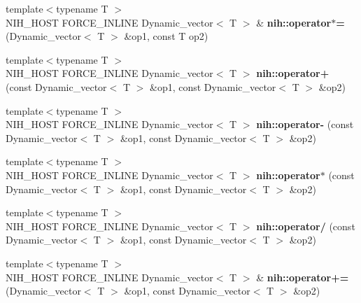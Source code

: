 \begin{DoxyCompactItemize}
\item 
\hypertarget{group__linalg_gaafcb7f500fcb5c8227c8c0b5f0161493}{
{\footnotesize template$<$typename T $>$ }\\\-N\-I\-H\-\_\-\-H\-O\-S\-T \-F\-O\-R\-C\-E\-\_\-\-I\-N\-L\-I\-N\-E \*
\-Dynamic\-\_\-vector$<$ \-T $>$ \& {\bfseries nih\-::operator$\ast$=} (\-Dynamic\-\_\-vector$<$ \-T $>$ \&op1, const \-T op2)}
\label{group__linalg_gaafcb7f500fcb5c8227c8c0b5f0161493}

\item 
\hypertarget{group__linalg_ga76724637f0956192e7a27a921043fa37}{
{\footnotesize template$<$typename T $>$ }\\\-N\-I\-H\-\_\-\-H\-O\-S\-T \-F\-O\-R\-C\-E\-\_\-\-I\-N\-L\-I\-N\-E \*
\-Dynamic\-\_\-vector$<$ \-T $>$ {\bfseries nih\-::operator+} (const \-Dynamic\-\_\-vector$<$ \-T $>$ \&op1, const \-Dynamic\-\_\-vector$<$ \-T $>$ \&op2)}
\label{group__linalg_ga76724637f0956192e7a27a921043fa37}

\item 
\hypertarget{group__linalg_ga6d28166a3044ce64d8a2ab00822cb0d4}{
{\footnotesize template$<$typename T $>$ }\\\-N\-I\-H\-\_\-\-H\-O\-S\-T \-F\-O\-R\-C\-E\-\_\-\-I\-N\-L\-I\-N\-E \*
\-Dynamic\-\_\-vector$<$ \-T $>$ {\bfseries nih\-::operator-\/} (const \-Dynamic\-\_\-vector$<$ \-T $>$ \&op1, const \-Dynamic\-\_\-vector$<$ \-T $>$ \&op2)}
\label{group__linalg_ga6d28166a3044ce64d8a2ab00822cb0d4}

\item 
\hypertarget{group__linalg_gaad54f453a918650977e577d1f1295942}{
{\footnotesize template$<$typename T $>$ }\\\-N\-I\-H\-\_\-\-H\-O\-S\-T \-F\-O\-R\-C\-E\-\_\-\-I\-N\-L\-I\-N\-E \*
\-Dynamic\-\_\-vector$<$ \-T $>$ {\bfseries nih\-::operator$\ast$} (const \-Dynamic\-\_\-vector$<$ \-T $>$ \&op1, const \-Dynamic\-\_\-vector$<$ \-T $>$ \&op2)}
\label{group__linalg_gaad54f453a918650977e577d1f1295942}

\item 
\hypertarget{group__linalg_gab31a91c8d2c51f20dd314272f8416391}{
{\footnotesize template$<$typename T $>$ }\\\-N\-I\-H\-\_\-\-H\-O\-S\-T \-F\-O\-R\-C\-E\-\_\-\-I\-N\-L\-I\-N\-E \*
\-Dynamic\-\_\-vector$<$ \-T $>$ {\bfseries nih\-::operator/} (const \-Dynamic\-\_\-vector$<$ \-T $>$ \&op1, const \-Dynamic\-\_\-vector$<$ \-T $>$ \&op2)}
\label{group__linalg_gab31a91c8d2c51f20dd314272f8416391}

\item 
\hypertarget{group__linalg_gabb3d30c7da278fc844597f94d0a15fec}{
{\footnotesize template$<$typename T $>$ }\\\-N\-I\-H\-\_\-\-H\-O\-S\-T \-F\-O\-R\-C\-E\-\_\-\-I\-N\-L\-I\-N\-E \*
\-Dynamic\-\_\-vector$<$ \-T $>$ \& {\bfseries nih\-::operator+=} (\-Dynamic\-\_\-vector$<$ \-T $>$ \&op1, const \-Dynamic\-\_\-vector$<$ \-T $>$ \&op2)}
\label{group__linalg_gabb3d30c7da278fc844597f94d0a15fec}


\end{DoxyCompactItemize}
